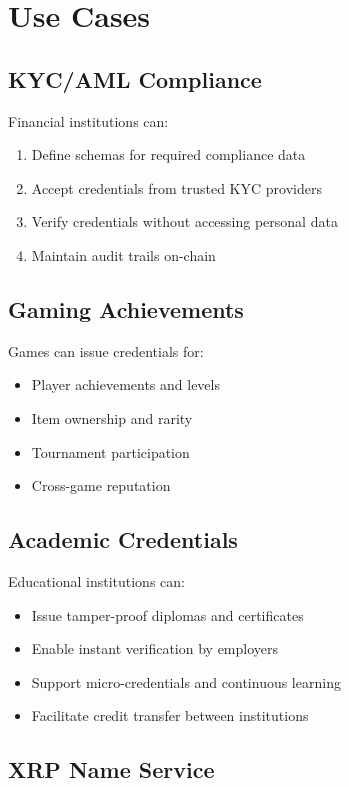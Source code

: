 \documentclass[11pt,a4paper]{article}
\begin{document}
\section{Use Cases}

\subsection{KYC/AML Compliance}

Financial institutions can:
\begin{enumerate}
    \item Define schemas for required compliance data
    \item Accept credentials from trusted KYC providers
    \item Verify credentials without accessing personal data
    \item Maintain audit trails on-chain
\end{enumerate}

\subsection{Gaming Achievements}

Games can issue credentials for:
\begin{itemize}
    \item Player achievements and levels
    \item Item ownership and rarity
    \item Tournament participation
    \item Cross-game reputation
\end{itemize}

\subsection{Academic Credentials}

Educational institutions can:
\begin{itemize}
    \item Issue tamper-proof diplomas and certificates
    \item Enable instant verification by employers
    \item Support micro-credentials and continuous learning
    \item Facilitate credit transfer between institutions
\end{itemize}

\subsection{XRP Name Service}
\end{document}
